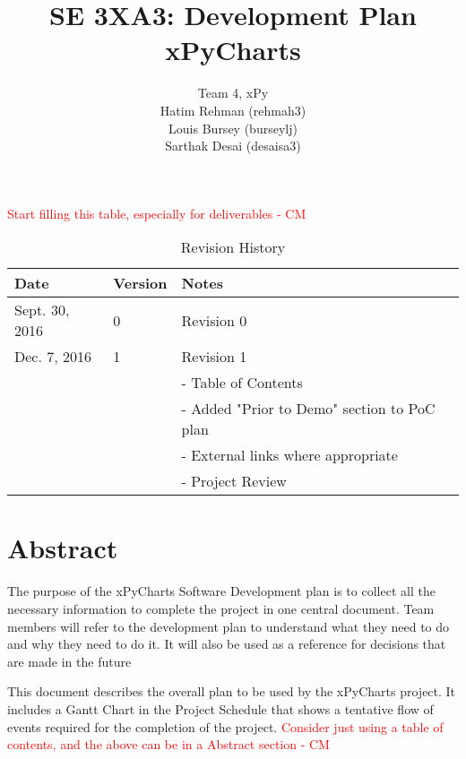 \documentclass{article}
\begin{document}
\title{SE 3XA3: Development Plan\\xPyCharts}

\author{Team 4, xPy
		\\ Hatim Rehman (rehmah3)
		\\ Louis Bursey (burseylj)
		\\ Sarthak Desai (desaisa3)
}

\date{}
\maketitle
\newpage
{}
\tableofcontents
\listoftables
\listoffigures



\textcolor{red}{Start filling this table, especially for deliverables - CM} \\
\begin{table}[hp]
\caption{Revision History} \label{TblRevisionHistory}
\begin{tabularx}{\textwidth}{llX}
\toprule
\toprule {\bf Date} & {\bf Version} & {\bf Notes}\\
\midrule
Sept. 30, 2016 & 0 & Revision 0\\
Dec. 7, 2016 & 1 & Revision 1 \\
 & & - Table of Contents \\
 & & - Added "Prior to Demo" section to PoC plan\\
 & & - External links where appropriate\\
 & & - Project Review\\
\bottomrule
\end{tabularx}
\end{table}

\newpage

\section{Abstract} %

The purpose of the xPyCharts Software Development plan is to collect all the necessary information to complete the project in one central document. Team members will refer to the development plan to understand what they need to do and why they need to do it. It will also be used as a reference for decisions that are made in the future

This document describes the overall plan to be used by the xPyCharts project. It includes a Gantt Chart in the Project Schedule that shows a tentative flow of events required for the completion of the project.
\textcolor{red}{ Consider just using a table of contents, and the above can be in a Abstract section - CM} \\
\end{document}

